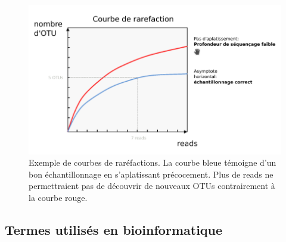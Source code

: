 \documentclass[12pt,a4paper]{article}
\begin{document}
\begin{figure}[ht]
\begin{center}
\includegraphics[scale=0.5]{img/rarefaction_example.png}\hfill
\end{center}
\caption{Exemple de courbes de raréfactions. La courbe bleue témoigne d'un bon échantillonnage en s’aplatissant précocement. Plus de reads ne permettraient pas de découvrir de nouveaux OTUs contrairement à la courbe rouge. }
\label{rarefaction_demo}
\end{figure}




\subsection{Termes utilisés en bioinformatique}
\end{document}

